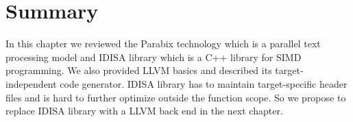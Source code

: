 \section{Summary}
In this chapter we reviewed the Parabix technology which is a parallel text processing model and IDISA library which is a C++ library for SIMD programming. We also provided LLVM basics and described its target-independent code generator. IDISA library has to maintain target-specific header files and is hard to further optimize outside the function scope. So we propose to replace IDISA library with a LLVM back end in the next chapter.

